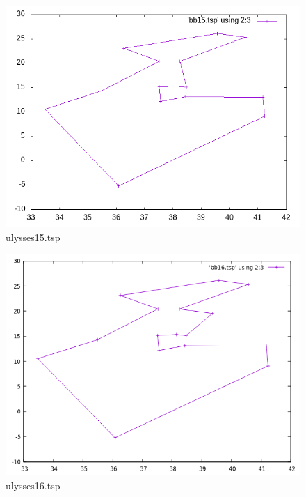 \documentclass[12pt,spanish]{article}
\begin{document}
\begin{figure}[H]
\centering
\includegraphics[scale=0.75]{bb15.png}
\caption{ulysses15.tsp}
\end{figure}

\begin{figure}[H]
\centering
\includegraphics[scale=0.75]{bb16.png}
\caption{ulysses16.tsp}
\end{figure}
\end{document}
